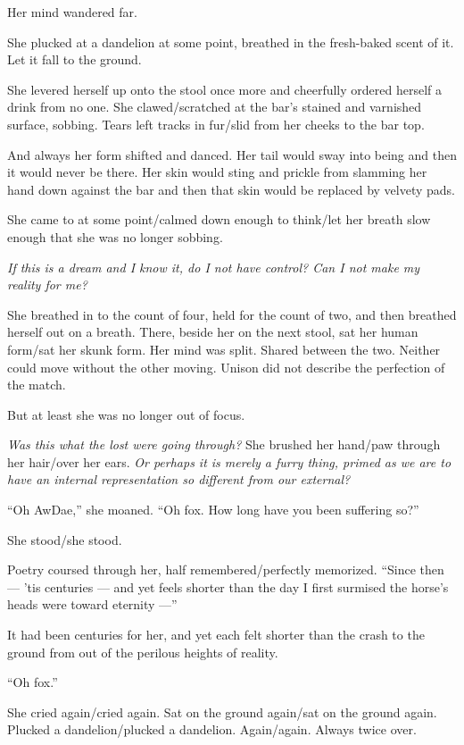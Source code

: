 Her mind wandered far.

She plucked at a dandelion at some point, breathed in the fresh-baked scent of it. Let it fall to the ground.

She levered herself up onto the stool once more and cheerfully ordered herself a drink from no one. She clawed/scratched at the bar's stained and varnished surface, sobbing. Tears left tracks in fur/slid from her cheeks to the bar top.

And always her form shifted and danced. Her tail would sway into being and then it would never be there. Her skin would sting and prickle from slamming her hand down against the bar and then that skin would be replaced by velvety pads.

She came to at some point/calmed down enough to think/let her breath slow enough that she was no longer sobbing.

\emph{If this is a dream and I know it, do I not have control? Can I not make my reality for me?}

She breathed in to the count of four, held for the count of two, and then breathed herself out on a breath. There, beside her on the next stool, sat her human form/sat her skunk form. Her mind was split. Shared between the two. Neither could move without the other moving. Unison did not describe the perfection of the match.

But at least she was no longer out of focus.

\emph{Was this what the lost were going through?} She brushed her hand/paw through her hair/over her ears. \emph{Or perhaps it is merely a furry thing, primed as we are to have an internal representation so different from our external?}

``Oh AwDae,'' she moaned. ``Oh fox. How long have you been suffering so?''

She stood/she stood.

Poetry coursed through her, half remembered/perfectly memorized. ``Since then — 'tis centuries — and yet feels shorter than the day I first surmised the horse's heads were toward eternity —''

It had been centuries for her, and yet each felt shorter than the crash to the ground from out of the perilous heights of reality.

``Oh fox.''

She cried again/cried again. Sat on the ground again/sat on the ground again. Plucked a dandelion/plucked a dandelion. Again/again. Always twice over.

